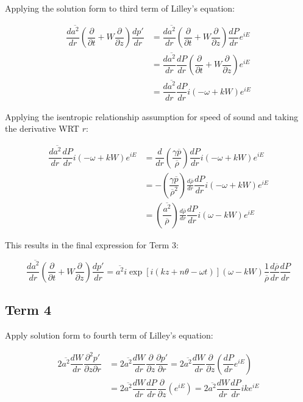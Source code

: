 \documentclass[]{aiaa-tc}%
\begin{document}
Applying the solution form to third term of Lilley's equation:

\begin{align*}
\dfrac{d \overline{a^2}}{dr} \left( \dfrac{\partial}{\partial t} + W \dfrac{\partial}{\partial z} \right) \dfrac{dp'}{dr}
&= \dfrac{d \overline{a^2}}{dr}
   \left( \dfrac{\partial}{\partial t} + W \dfrac{\partial}{\partial z} \right)
   \dfrac{dP}{dr} e^{iE}  \\
&= \dfrac{d \overline{a^2}}{dr} \dfrac{dP}{dr}
   \left( \dfrac{\partial}{\partial t} + W \dfrac{\partial}{\partial z} \right) e^{iE} \\
&= \dfrac{d \overline{a^2}}{dr} \dfrac{dP}{dr}
    i(-\omega + kW) e^{iE}
\end{align*}

Applying the isentropic relationship assumption for speed of sound and taking the derivative WRT $r$:

\begin{align*}
\dfrac{d \overline{a^2}}{dr} \dfrac{dP}{dr}
    i(-\omega + kW) e^{iE}
&= \dfrac{d}{dr} \left(\dfrac{\gamma \overline{p}}{\overline{\rho}}\right)
    \dfrac{dP}{dr} i(-\omega + kW) e^{iE} \\
&= -\left(\dfrac{\gamma \overline{p}}{\overline{\rho}^2}\right) \frac{d \overline{\rho}}{dr}
    \dfrac{dP}{dr} i(-\omega + kW) e^{iE} \\
&= \left(\dfrac{\overline{a^2}}{\overline{\rho}}\right) \frac{d \overline{\rho}}{dr} \dfrac{dP}{dr} i(\omega - kW) e^{iE}
\end{align*}

This results in the final expression for Term 3:

\begin{equation} \label{term3soln}
\boxed{\dfrac{d \overline{a^2}}{dr} \left( \dfrac{\partial}{\partial t} + W \dfrac{\partial}{\partial z} \right) \dfrac{dp'}{dr}
= \overline{a^2} i\exp[i(kz + n\theta -\omega t)] (\omega - kW)
    \dfrac{1}{\overline{\rho}}\frac{d \overline{\rho}}{dr} \dfrac{dP}{dr} }
\end{equation}




\subsection{Term 4}

Apply solution form to fourth term of Lilley's equation:


\begin{align*}
2\overline{a^2} \dfrac{dW}{dr}\dfrac{\partial^2 p'}{\partial z \partial r}
  &= 2\overline{a^2} \dfrac{dW}{dr} \dfrac{\partial }{\partial z}
    \dfrac{\partial p'}{\partial r}
    = 2\overline{a^2} \dfrac{dW}{dr} \dfrac{\partial }{\partial z}
    \left( \dfrac{dP}{dr} e^{iE} \right) \\
&= 2\overline{a^2} \dfrac{dW}{dr} \dfrac{dP}{dr}
    \dfrac{\partial }{\partial z} \left( e^{iE} \right)
    = 2\overline{a^2} \dfrac{dW}{dr} \dfrac{dP}{dr} ike^{iE}
\end{align*}
\end{document}

